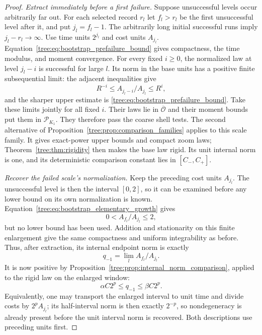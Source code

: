 \begin{proof}
\smallskip\noindent\emph{Extract immediately before a first failure.}
Suppose unsuccessful levels occur arbitrarily far out.
For each selected record $r_l$ let $f_l>r_l$
be the first unsuccessful level after it, and put
$j_l=f_l-1$.  The arbitrarily long initial successful
runs imply $j_l-r_l\to\infty$.
Use time units $2^{j_l}$ and cost units $A_{j_l}$.
Equation~\eqref{tree:eq:bootstrap_prefailure_bound} gives
compactness, the time modulus, and moment convergence.
For every fixed $i\geq0$, the normalized law at level
$j_l-i$ is successful for large $l$.  Its norm in the
base units has a positive finite subsequential limit:
the adjacent inequalities give
\[
 R^{-i}\leq A_{j_l-i}/A_{j_l}\leq R^i,
\]
and the sharper upper estimate is
\eqref{tree:eq:bootstrap_prefailure_bound}.  Take these limits
jointly for all fixed $i$.  Their laws lie in
$\overline{\mathcal O}$ and their moment bounds put them
in $\mathcal P_{K_1}$.  They therefore pass the coarse
shell tests.  The second alternative of
Proposition~\ref{tree:prop:comparison_families} applies to
this scale family.  It gives exact-power upper bounds
and compact zoom laws; Theorem~\ref{tree:thm:rigidity} then
makes the base law rigid.  Its unit internal norm is
one, and its deterministic comparison constant lies
in $[C_-,C_+]$.

\smallskip\noindent\emph{Recover the failed scale's normalization.}
Keep the preceding cost units $A_{j_l}$.  The unsuccessful level
is then the interval $[0,2]$, so it can be examined before any
lower bound on its own normalization is known.
Equation~\eqref{tree:eq:bootstrap_elementary_growth} gives
\begin{equation}
 0< A_{f_l}/A_{j_l}\leq2,
 \label{tree:eq:bootstrap_failed_upper_only}
\end{equation}
but no lower bound has been used.  Addition and
stationarity on this finite enlargement give the
same compactness and uniform integrability as before.
Thus, after extraction, its internal endpoint norm is
exactly
\[
 q_{-1}=\lim_l A_{f_l}/A_{j_l}.
\]
It is now positive by
Proposition~\ref{tree:prop:internal_norm_comparison}, applied
to the rigid law on the enlarged window:
\begin{equation}
 \alpha C2^p\leq q_{-1}\leq\beta C2^p.
 \label{tree:eq:bootstrap_failed_positive}
\end{equation}
Equivalently, one may transport the enlarged interval
to unit time and divide costs by $2^pA_{j_l}$; its
half-interval norm is then exactly $2^{-p}$, so
nondegeneracy is already present before the unit
interval norm is recovered.  Both descriptions use
preceding units first.


\end{proof}

